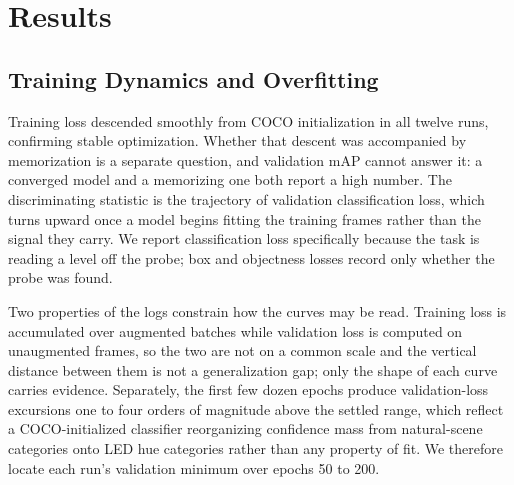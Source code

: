 ﻿\documentclass[journal]{IEEEtran}
\begin{document}
\section{Results}
\label{sec:results}

\subsection{Training Dynamics and Overfitting}
\label{sec:dynamics}
Training loss descended smoothly from COCO initialization in all twelve runs, confirming stable optimization. Whether that descent was accompanied by memorization is a separate question, and validation mAP cannot answer it: a converged model and a memorizing one both report a high number. The discriminating statistic is the trajectory of validation classification loss, which turns upward once a model begins fitting the training frames rather than the signal they carry. We report classification loss specifically because the task is reading a level off the probe; box and objectness losses record only whether the probe was found.

Two properties of the logs constrain how the curves may be read. Training loss is accumulated over augmented batches while validation loss is computed on unaugmented frames, so the two are not on a common scale and the vertical distance between them is not a generalization gap; only the shape of each curve carries evidence. Separately, the first few dozen epochs produce validation-loss excursions one to four orders of magnitude above the settled range, which reflect a COCO-initialized classifier reorganizing confidence mass from natural-scene categories onto LED hue categories rather than any property of fit. We therefore locate each run's validation minimum over epochs 50 to 200.
\end{document}
